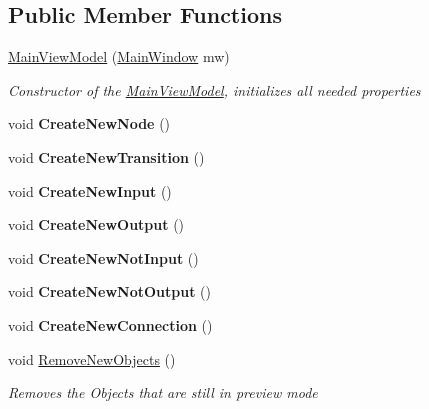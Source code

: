 \subsection*{Public Member Functions}
\begin{DoxyCompactItemize}
\item 
\hyperlink{class_prototipo_t_f_g_1_1_main_view_model_af1d2d787971cf886b86cad8e1fa2d5aa}{Main\+View\+Model} (\hyperlink{class_prototipo_t_f_g_1_1_main_window}{Main\+Window} mw)
\begin{DoxyCompactList}\small\item\em Constructor of the \hyperlink{class_prototipo_t_f_g_1_1_main_view_model}{Main\+View\+Model}, initializes all needed properties \end{DoxyCompactList}\item 
\hypertarget{class_prototipo_t_f_g_1_1_main_view_model_ac122a09e031956815634feb4590c7b44}{}void {\bfseries Create\+New\+Node} ()\label{class_prototipo_t_f_g_1_1_main_view_model_ac122a09e031956815634feb4590c7b44}

\item 
\hypertarget{class_prototipo_t_f_g_1_1_main_view_model_a438b78a7005e545cd928ca2bd8b06614}{}void {\bfseries Create\+New\+Transition} ()\label{class_prototipo_t_f_g_1_1_main_view_model_a438b78a7005e545cd928ca2bd8b06614}

\item 
\hypertarget{class_prototipo_t_f_g_1_1_main_view_model_a2bf8de5ffb0c535b2b3e20241b8e0c57}{}void {\bfseries Create\+New\+Input} ()\label{class_prototipo_t_f_g_1_1_main_view_model_a2bf8de5ffb0c535b2b3e20241b8e0c57}

\item 
\hypertarget{class_prototipo_t_f_g_1_1_main_view_model_aaf75ff91267be1252610ab08ce7d5027}{}void {\bfseries Create\+New\+Output} ()\label{class_prototipo_t_f_g_1_1_main_view_model_aaf75ff91267be1252610ab08ce7d5027}

\item 
\hypertarget{class_prototipo_t_f_g_1_1_main_view_model_a1f0d8ff424feca4212dbfa5cc3043240}{}void {\bfseries Create\+New\+Not\+Input} ()\label{class_prototipo_t_f_g_1_1_main_view_model_a1f0d8ff424feca4212dbfa5cc3043240}

\item 
\hypertarget{class_prototipo_t_f_g_1_1_main_view_model_a9044e08383faf96eb7d0ed84fcd2d6a2}{}void {\bfseries Create\+New\+Not\+Output} ()\label{class_prototipo_t_f_g_1_1_main_view_model_a9044e08383faf96eb7d0ed84fcd2d6a2}

\item 
\hypertarget{class_prototipo_t_f_g_1_1_main_view_model_a451218126a88174bfd96dfe792eb023a}{}void {\bfseries Create\+New\+Connection} ()\label{class_prototipo_t_f_g_1_1_main_view_model_a451218126a88174bfd96dfe792eb023a}

\item 
void \hyperlink{class_prototipo_t_f_g_1_1_main_view_model_a23b64028671b7abc48504a0e87a85f95}{Remove\+New\+Objects} ()
\begin{DoxyCompactList}\small\item\em Removes the Objects that are still in preview mode \end{DoxyCompactList}\end{DoxyCompactItemize}

